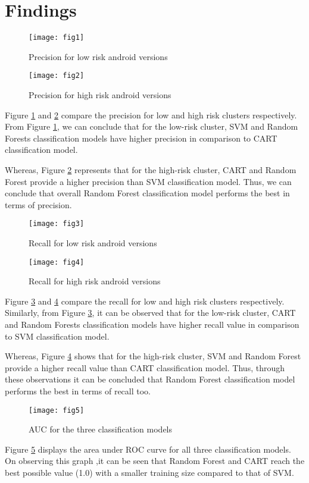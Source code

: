\documentclass[11pt]{article} %
\begin{document}
\section{Findings} 
\begin{figure}[h!]
    \centering
    \texttt{[image: fig1]}
    \caption{Precision for low risk android versions}
    \label{fig1}
\end{figure}
\begin{figure}[h!]
    \centering
    \texttt{[image: fig2]}
    \caption{Precision for high risk android versions}
    \label{fig2}
\end{figure}
Figure \ref{fig1} and \ref{fig2} compare the precision for low and high risk clusters respectively. From Figure \ref{fig1}, we can conclude that for the low-risk cluster, SVM and Random Forests classification models have higher precision in comparison to CART classification model. 

Whereas, Figure \ref{fig2} represents that for the high-risk cluster, CART and Random Forest provide a higher precision than SVM classification model. Thus, we can conclude that overall Random Forest classification model performs the best in terms of precision.

\begin{figure}[h!]
    \centering
    \texttt{[image: fig3]}
    \caption{Recall for low risk android versions}
    \label{fig3}
\end{figure}
\begin{figure}[h!]
    \centering
    \texttt{[image: fig4]}
    \caption{Recall for high risk android versions}
    \label{fig4}
\end{figure}
Figure \ref{fig3} and \ref{fig4} compare the recall for low and high risk clusters respectively. Similarly, from Figure \ref{fig3}, it can be observed that for the low-risk cluster, CART and Random Forests classification models have higher recall value in comparison to SVM classification model. 

Whereas, Figure \ref{fig4} shows that for the high-risk cluster, SVM and Random Forest provide a higher recall value than CART classification model. Thus, through these observations it can be concluded that Random Forest classification model performs the best in terms of recall too.

\begin{figure}[h!]
    \centering
    \texttt{[image: fig5]}
    \caption{AUC for the three classification models}
    \label{fig5}
\end{figure}
Figure \ref{fig5} displays the area under ROC curve for all three classification models. On observing this graph ,it can be seen that Random Forest and CART reach the best possible value (1.0) with a smaller training size compared to that of SVM.
\end{document}
